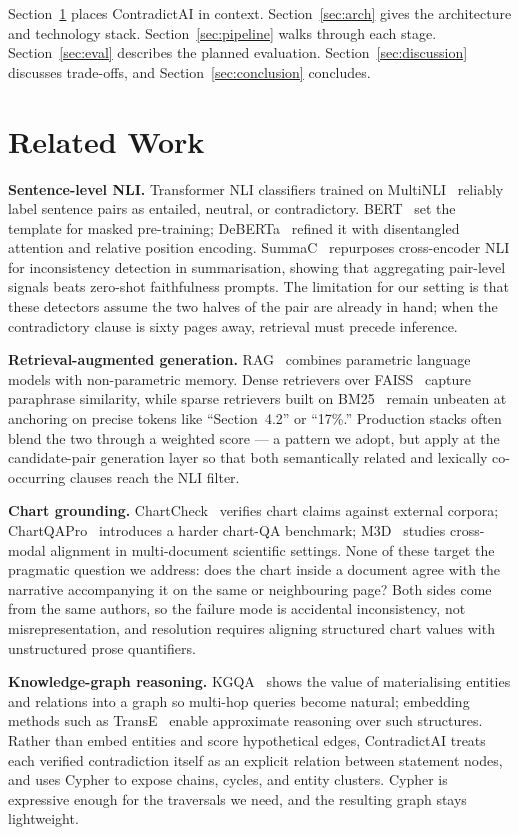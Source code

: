 \documentclass[conference]{IEEEtran}
\begin{document}
Section~\ref{sec:related} places ContradictAI in context. Section~\ref{sec:arch} gives the architecture and technology stack. Section~\ref{sec:pipeline} walks through each stage. Section~\ref{sec:eval} describes the planned evaluation. Section~\ref{sec:discussion} discusses trade-offs, and Section~\ref{sec:conclusion} concludes.

\section{Related Work}\label{sec:related}
\textbf{Sentence-level NLI.} Transformer NLI classifiers trained on MultiNLI~\cite{b4} reliably label sentence pairs as entailed, neutral, or contradictory. BERT~\cite{b2} set the template for masked pre-training; DeBERTa~\cite{b3} refined it with disentangled attention and relative position encoding. SummaC~\cite{b1} repurposes cross-encoder NLI for inconsistency detection in summarisation, showing that aggregating pair-level signals beats zero-shot faithfulness prompts. The limitation for our setting is that these detectors assume the two halves of the pair are already in hand; when the contradictory clause is sixty pages away, retrieval must precede inference.

\textbf{Retrieval-augmented generation.} RAG~\cite{b5} combines parametric language models with non-parametric memory. Dense retrievers over FAISS~\cite{b6} capture paraphrase similarity, while sparse retrievers built on BM25~\cite{b7} remain unbeaten at anchoring on precise tokens like ``Section~4.2'' or ``17\%.'' Production stacks often blend the two through a weighted score --- a pattern we adopt, but apply at the candidate-pair generation layer so that both semantically related and lexically co-occurring clauses reach the NLI filter.

\textbf{Chart grounding.} ChartCheck~\cite{b8} verifies chart claims against external corpora; ChartQAPro~\cite{b9} introduces a harder chart-QA benchmark; M3D~\cite{b10} studies cross-modal alignment in multi-document scientific settings. None of these target the pragmatic question we address: does the chart inside a document agree with the narrative accompanying it on the same or neighbouring page? Both sides come from the same authors, so the failure mode is accidental inconsistency, not misrepresentation, and resolution requires aligning structured chart values with unstructured prose quantifiers.

\textbf{Knowledge-graph reasoning.} KGQA~\cite{b11} shows the value of materialising entities and relations into a graph so multi-hop queries become natural; embedding methods such as TransE~\cite{b12} enable approximate reasoning over such structures. Rather than embed entities and score hypothetical edges, ContradictAI treats each verified contradiction itself as an explicit relation between statement nodes, and uses Cypher to expose chains, cycles, and entity clusters. Cypher is expressive enough for the traversals we need, and the resulting graph stays lightweight.
\end{document}
